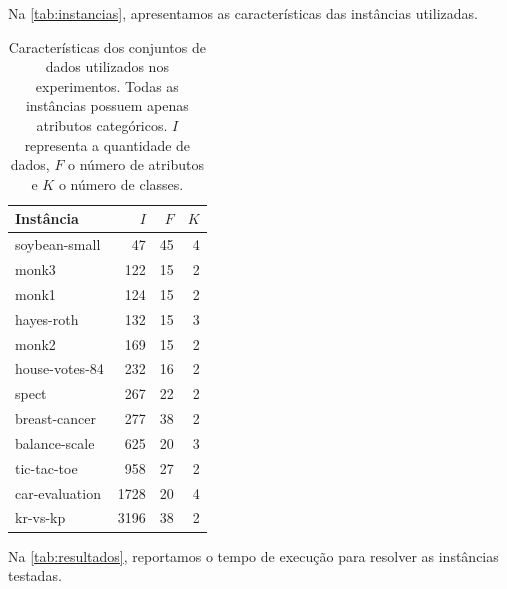 \documentclass[12pt,a4paper]{article}
\begin{document}
Na \autoref*{tab:instancias}, apresentamos as características das instâncias utilizadas.
\begin{table}[H]
    \centering
    \renewcommand{\arraystretch}{1.2} 
    \setlength{\tabcolsep}{40pt}
    \begin{tabular}{lrrr}
        \toprule
            Instância       & $I$    & $F$  & $K$ \\ 
        \midrule
            soybean-small  & 47   & 45 & 4 \\ 
            monk3          & 122  & 15 & 2 \\ 
            monk1          & 124  & 15 & 2 \\ 
            hayes-roth     & 132  & 15 & 3 \\ 
            monk2          & 169  & 15 & 2 \\ 
            house-votes-84 & 232  & 16 & 2 \\ 
            spect          & 267  & 22 & 2 \\ 
            breast-cancer  & 277  & 38 & 2 \\ 
            balance-scale  & 625  & 20 & 3 \\ 
            tic-tac-toe    & 958  & 27 & 2 \\ 
            car-evaluation & 1728 & 20 & 4 \\ 
            kr-vs-kp       & 3196 & 38 & 2 \\   
        \bottomrule 
    \end{tabular}
    \caption{Características dos conjuntos de dados utilizados nos experimentos.
    Todas as instâncias possuem apenas atributos categóricos. $I$ representa
    a quantidade de dados, $F$ o número de atributos e $K$ o número de classes.}
    \label{tab:instancias}
\end{table}

Na \autoref*{tab:resultados}, reportamos o tempo de execução para resolver as 
instâncias testadas.
\end{document}
